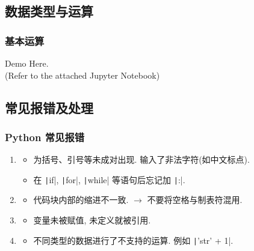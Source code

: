 \documentclass[handout]{ctexbeamer}
\begin{document}
    \subsection{数据类型与运算}
    \begin{frame}[fragile]
        \frametitle{基本运算}
        \begin{center}
            \Large Demo Here. \\
            (Refer to the attached Jupyter Notebook)
        \end{center}
    \end{frame}

    \subsection{常见报错及处理}
    \begin{frame}
        \frametitle{Python 常见报错}
        \begin{enumerate}
            \item<1-> 
            \begin{itemize}
                \item 为括号、引号等未成对出现. 输入了非法字符(如中文标点).
                \item 在 \texttt|if|, \texttt|for|, \texttt|while| 等语句后忘记加 \texttt|:|.
            \end{itemize}
            \item<2-> 
            \begin{itemize}
                \item 代码块内部的缩进不一致. $\to$ 不要将空格与制表符混用.
            \end{itemize} 
            \item<3-> 
            \begin{itemize}
                \item 变量未被赋值, 未定义就被引用.
            \end{itemize} 
            \item<4-> 
            \begin{itemize}
                \item 不同类型的数据进行了不支持的运算. 例如 \texttt|'str' + 1|.

\end{itemize}
\end{enumerate}
\end{frame}
\end{document}
